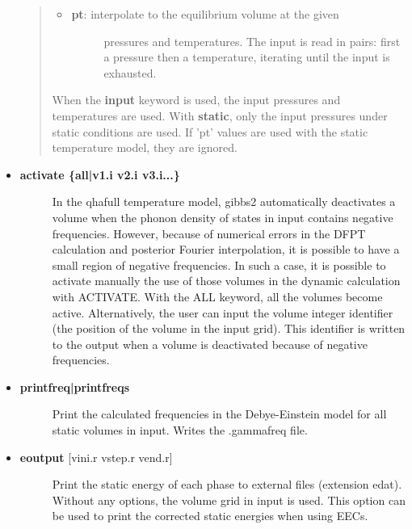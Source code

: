 \documentclass[a4paper]{article}
\begin{document}
\begin{itemize}
\begin{quote}
\begin{itemize}
\begin{description}
\end{description}

\item 
\begin{description}
\item[{\textbf{pt}: interpolate to the equilibrium volume at the given}] \leavevmode 
pressures and temperatures. The input is read in pairs:
first a pressure then a temperature, iterating until the
input is exhausted.

\end{description}
\end{itemize}

When the \textbf{input} keyword is used, the input pressures and
temperatures are used. With \textbf{static}, only the input pressures
under static conditions are used. If 'pt' values are used with
the static temperature model, they are ignored.
\end{quote}

\item 
\begin{description}
\item[{\textbf{activate \{all|v1.i v2.i v3.i...\}}}] \leavevmode 
In the qhafull temperature model, gibbs2 automatically deactivates
a volume when the phonon density of states in input contains
negative frequencies. However, because of numerical errors in the
DFPT calculation and posterior Fourier interpolation, it is
possible to have a small region of negative frequencies. In such a
case, it is possible to activate manually the use of those volumes
in the dynamic calculation with ACTIVATE. With the ALL keyword, all
the volumes become active. Alternatively, the user can input the
volume integer identifier (the position of the volume in the input
grid). This identifier is written to the output when a volume is
deactivated because of negative frequencies.

\end{description}

\item 
\begin{description}
\item[{\textbf{printfreq|printfreqs}}] \leavevmode 
Print the calculated frequencies in the Debye-Einstein model for
all static volumes in input. Writes the .gammafreq file.

\end{description}

\item 
\begin{description}
\item[{\textbf{eoutput} {[}vini.r vstep.r vend.r{]}}] \leavevmode 
Print the static energy of each phase to external files (extension
edat). Without any options, the volume grid in input is used. This
option can be used to print the corrected static energies when
using EECs.


\end{description}
\end{itemize}
\end{document}
